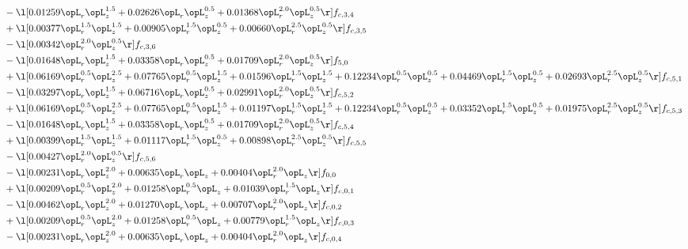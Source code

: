 \begin{alignat}{2}
& - \l[  0.01259 \opL_r \opL_z^{1.5} +  0.02626 \opL_r \opL_z^{0.5} +  0.01368 \opL_r^{2.0} \opL_z^{0.5}  \r] f_{c,3,4} \nonumber \\ 
& + \l[  0.00377 \opL_r^{1.5} \opL_z^{1.5} +  0.00905 \opL_r^{1.5} \opL_z^{0.5} +  0.00660 \opL_r^{2.5} \opL_z^{0.5}  \r] f_{c,3,5} \nonumber \\ 
& - \l[  0.00342 \opL_r^{2.0} \opL_z^{0.5}  \r] f_{c,3,6} \nonumber \\ 
& - \l[  0.01648 \opL_r \opL_z^{1.5} +  0.03358 \opL_r \opL_z^{0.5} +  0.01709 \opL_r^{2.0} \opL_z^{0.5}  \r] f_{5,0} \nonumber \\ 
& + \l[  0.06169 \opL_r^{0.5} \opL_z^{2.5} +  0.07765 \opL_r^{0.5} \opL_z^{1.5} +  0.01596 \opL_r^{1.5} \opL_z^{1.5} +  0.12234 \opL_r^{0.5} \opL_z^{0.5} +  0.04469 \opL_r^{1.5} \opL_z^{0.5} +  0.02693 \opL_r^{2.5} \opL_z^{0.5}  \r] f_{c,5,1} \nonumber \\ 
& - \l[  0.03297 \opL_r \opL_z^{1.5} +  0.06716 \opL_r \opL_z^{0.5} +  0.02991 \opL_r^{2.0} \opL_z^{0.5}  \r] f_{c,5,2} \nonumber \\ 
& + \l[  0.06169 \opL_r^{0.5} \opL_z^{2.5} +  0.07765 \opL_r^{0.5} \opL_z^{1.5} +  0.01197 \opL_r^{1.5} \opL_z^{1.5} +  0.12234 \opL_r^{0.5} \opL_z^{0.5} +  0.03352 \opL_r^{1.5} \opL_z^{0.5} +  0.01975 \opL_r^{2.5} \opL_z^{0.5}  \r] f_{c,5,3} \nonumber \\ 
& - \l[  0.01648 \opL_r \opL_z^{1.5} +  0.03358 \opL_r \opL_z^{0.5} +  0.01709 \opL_r^{2.0} \opL_z^{0.5}  \r] f_{c,5,4} \nonumber \\ 
& + \l[  0.00399 \opL_r^{1.5} \opL_z^{1.5} +  0.01117 \opL_r^{1.5} \opL_z^{0.5} +  0.00898 \opL_r^{2.5} \opL_z^{0.5}  \r] f_{c,5,5} \nonumber \\ 
& - \l[  0.00427 \opL_r^{2.0} \opL_z^{0.5}  \r] f_{c,5,6} \nonumber \\ 
& - \l[  0.00231 \opL_r \opL_z^{2.0} +  0.00635 \opL_r \opL_z +  0.00404 \opL_r^{2.0} \opL_z  \r] f_{0,0} \nonumber \\ 
& + \l[  0.00209 \opL_r^{0.5} \opL_z^{2.0} +  0.01258 \opL_r^{0.5} \opL_z +  0.01039 \opL_r^{1.5} \opL_z  \r] f_{c,0,1} \nonumber \\ 
& - \l[  0.00462 \opL_r \opL_z^{2.0} +  0.01270 \opL_r \opL_z +  0.00707 \opL_r^{2.0} \opL_z  \r] f_{c,0,2} \nonumber \\ 
& + \l[  0.00209 \opL_r^{0.5} \opL_z^{2.0} +  0.01258 \opL_r^{0.5} \opL_z +  0.00779 \opL_r^{1.5} \opL_z  \r] f_{c,0,3} \nonumber \\ 
& - \l[  0.00231 \opL_r \opL_z^{2.0} +  0.00635 \opL_r \opL_z +  0.00404 \opL_r^{2.0} \opL_z  \r] f_{c,0,4} \nonumber \\ 

\end{alignat}
